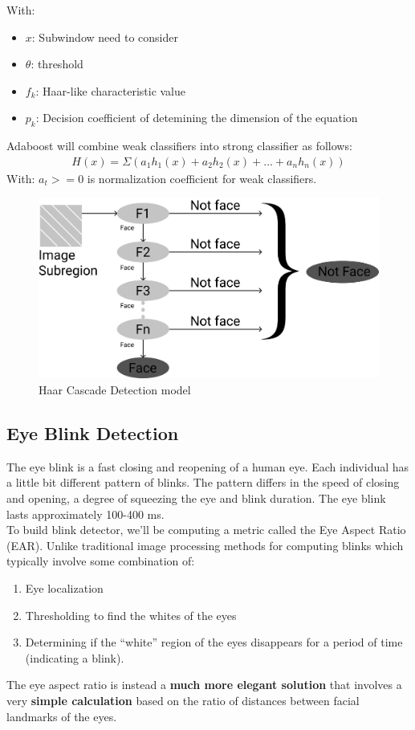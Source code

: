             With: 
            \begin{itemize}
                \item $x$: Subwindow need to consider
                \item $\theta$: threshold
                \item $f_k$: Haar-like characteristic value
                \item $p_k$: Decision coefficient of detemining the dimension of the equation
            \end{itemize}
            Adaboost will combine weak classifiers into strong classifier as follows:
            \begin{align}
                H(x) = \Sigma(a_1 h_1(x) + a_2 h_2(x) +...+ a_n h_n(x))
            \end{align}
            With: $a_t >= 0$ is normalization coefficient for weak classifiers.
            \begin{figure}[H]
                \centering
                \includegraphics[width=0.6\linewidth]{img/Haar-Cascade.png}
                \caption{Haar Cascade Detection model}
            \end{figure}

    \subsection{Eye Blink Detection}
        The eye blink is a fast closing and reopening of a human eye. Each individual has a little bit different pattern of blinks. The pattern differs in the speed of closing and opening, a degree of squeezing 
        the eye and blink duration. The eye blink lasts approximately 100-400 ms. \\ 
        \vspace{3mm}
        To build blink detector, we’ll be computing a metric called the Eye Aspect Ratio (EAR). Unlike traditional image processing methods for computing blinks which typically involve some combination of: 
        \begin{enumerate}
            \item Eye localization
            \item Thresholding to find the whites of the eyes
            \item Determining if the “white” region of the eyes disappears for a period of time (indicating a blink).
        \end{enumerate}
        The eye aspect ratio is instead a \textbf{much more elegant solution} that involves a very \textbf{simple calculation} based on the ratio of distances between facial landmarks of the eyes.
